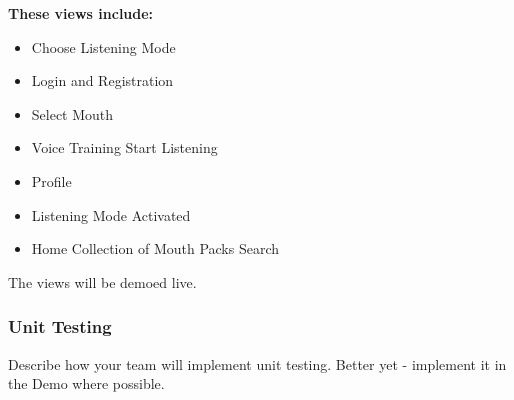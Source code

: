 \documentclass{article}
\begin{document}
\textbf{These views include:}
\begin{itemize}
    \item Choose Listening Mode
    \item Login and Registration
    \item Select Mouth
    \item Voice Training Start Listening
    \item Profile
    \item Listening Mode Activated
    \item Home
    \Item Collection of Mouth Packs
    \Item Search
\end{itemize}

The views will be demoed live.

\subsubsection{Unit Testing}
Describe how your team will implement unit testing. Better yet - implement it in the Demo where possible.
\end{document}
